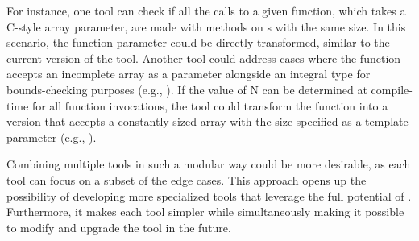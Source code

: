 For instance, one tool can check if all the calls to a given function, which takes a C-style array parameter, are made with  methods on s with the same size. In this scenario, the function parameter could be directly transformed, similar to the current version of the tool. 
Another tool could address cases where the function accepts an incomplete array as a parameter alongside an integral type for bounds-checking purposes (e.g., ).
If the value of N can be determined at compile-time for all function invocations, the tool could transform the function into a version that accepts a constantly sized array with the size specified as a template parameter (e.g., ).

Combining multiple tools in such a modular way could be more desirable, as each tool can focus on a subset of the edge cases. This approach opens up the possibility of developing more specialized tools that leverage the full potential of .
Furthermore, it makes each tool simpler while simultaneously making it possible to modify and upgrade the tool in the future.
